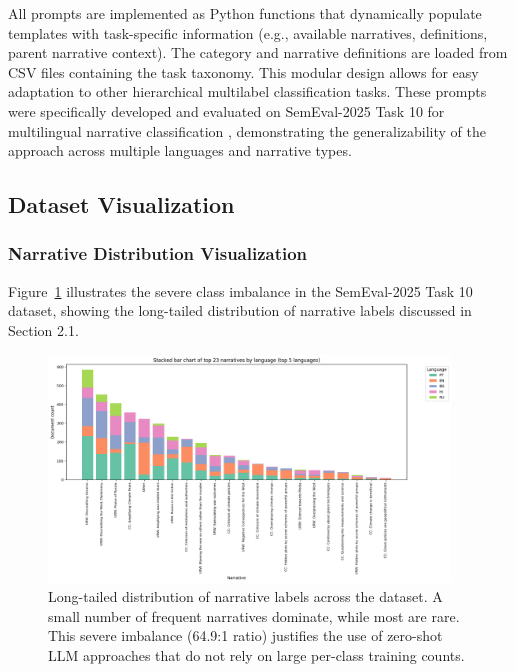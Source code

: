 All prompts are implemented as Python functions that dynamically populate templates with task-specific information (e.g., available narratives, definitions, parent narrative context). The category and narrative definitions are loaded from CSV files containing the task taxonomy. This modular design allows for easy adaptation to other hierarchical multilabel classification tasks. These prompts were specifically developed and evaluated on SemEval-2025 Task 10 for multilingual narrative classification \citep{semeval2025task10}, demonstrating the generalizability of the approach across multiple languages and narrative types.

\subsection{Dataset Visualization}

\subsubsection{Narrative Distribution Visualization}

Figure~\ref{fig:narrative_distribution} illustrates the severe class imbalance in the SemEval-2025 Task 10 dataset, showing the long-tailed distribution of narrative labels discussed in Section 2.1.

\begin{figure}[!ht]
\centering
\includegraphics[width=0.95\textwidth]{assets/images/data_description/narrative_distribution.png}
\caption{Long-tailed distribution of narrative labels across the dataset. A small number of frequent narratives dominate, while most are rare. This severe imbalance (64.9:1 ratio) justifies the use of zero-shot LLM approaches that do not rely on large per-class training counts.}
\label{fig:narrative_distribution}
\end{figure}
